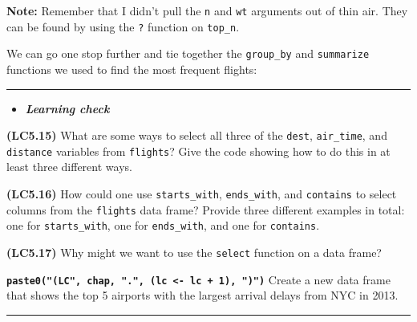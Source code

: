 \documentclass[]{tufte-book}
\newenvironment{Shaded}{\begin{snugshade}}{\end{snugshade}}
\newcommand{\KeywordTok}[1]{\textcolor[rgb]{0.13,0.29,0.53}{\textbf{{#1}}}}
\newcommand{\DataTypeTok}[1]{\textcolor[rgb]{0.13,0.29,0.53}{{#1}}}
\newcommand{\DecValTok}[1]{\textcolor[rgb]{0.00,0.00,0.81}{{#1}}}
\newcommand{\StringTok}[1]{\textcolor[rgb]{0.31,0.60,0.02}{{#1}}}
\newcommand{\NormalTok}[1]{{#1}}
\let\oldrule=\rule
\renewcommand{\rule}[1]{\oldrule{\linewidth}}
\newenvironment{rmdblock}[1]
  {\begin{shaded*}
  \begin{itemize}
  \renewcommand{\labelitemi}{
    \raisebox{-.7\height}[0pt][0pt]{
    }
  }
  \item
  }
  {
  \end{itemize}
  \end{shaded*}
  }
\newenvironment{learncheck}
  {\begin{rmdblock}{warning}}
  {\end{rmdblock}}
\theoremstyle{definition}
\theoremstyle{definition}
\theoremstyle{remark}
\begin{document}
\textbf{Note:} Remember that I didn't pull the \texttt{n} and
\texttt{wt} arguments out of thin air. They can be found by using the
\texttt{?} function on \texttt{top\_n}.

We can go one stop further and tie together the \texttt{group\_by} and
\texttt{summarize} functions we used to find the most frequent flights:

\begin{Shaded}
\end{Shaded}

\begin{center}\rule{0.5\linewidth}{\linethickness}\end{center}

\begin{learncheck}
\textbf{\emph{Learning check}}
\end{learncheck}

\textbf{(LC5.15)} What are some ways to select all three of the
\texttt{dest}, \texttt{air\_time}, and \texttt{distance} variables from
\texttt{flights}? Give the code showing how to do this in at least three
different ways.

\textbf{(LC5.16)} How could one use \texttt{starts\_with},
\texttt{ends\_with}, and \texttt{contains} to select columns from the
\texttt{flights} data frame? Provide three different examples in total:
one for \texttt{starts\_with}, one for \texttt{ends\_with}, and one for
\texttt{contains}.

\textbf{(LC5.17)} Why might we want to use the \texttt{select} function
on a data frame?

\textbf{\texttt{paste0("(LC",\ chap,\ ".",\ (lc\ \textless{}-\ lc\ +\ 1),\ ")")}}
Create a new data frame that shows the top 5 airports with the largest
arrival delays from NYC in 2013.

\begin{center}\rule{0.5\linewidth}{\linethickness}\end{center}
\end{document}
